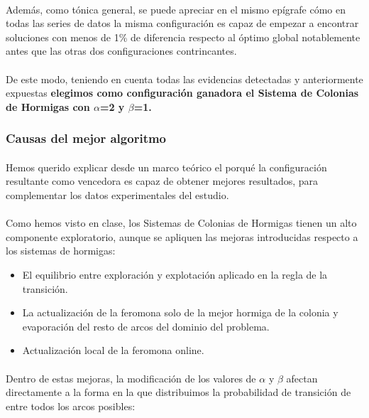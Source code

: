 	\paragraph{}Además, como tónica general, se puede apreciar en el mismo epígrafe cómo en todas las series de datos la misma configuración es capaz de empezar a encontrar soluciones con menos de 1\% de diferencia respecto al óptimo global notablemente antes que las otras dos configuraciones contrincantes.
	
	\paragraph{}De este modo, teniendo en cuenta todas las evidencias detectadas y anteriormente expuestas \textbf{elegimos como configuración ganadora el Sistema de Colonias de Hormigas con $\alpha$=2 y $\beta$=1.} 
	
	\subsubsection{Causas del mejor algoritmo}
	
	\paragraph{}Hemos querido explicar desde un marco teórico el porqué la configuración resultante como vencedora es capaz de obtener mejores resultados, para complementar los datos experimentales del estudio.
	
	\paragraph{}Como hemos visto en clase, los Sistemas de Colonias de Hormigas tienen un alto componente exploratorio, aunque se apliquen las mejoras introducidas respecto a los sistemas de hormigas:
	
	\begin{itemize}
		\item El equilibrio entre exploración y explotación aplicado en la regla de la transición.
		\item La actualización de la feromona solo de la mejor hormiga de la colonia y evaporación del resto de arcos del dominio del problema.
		\item Actualización local de la feromona online.
	\end{itemize}

	\paragraph{}Dentro de estas mejoras, la modificación de los valores de $\alpha$ y $\beta$ afectan directamente a la forma en la que distribuimos la probabilidad de transición de entre todos los arcos posibles:
	
